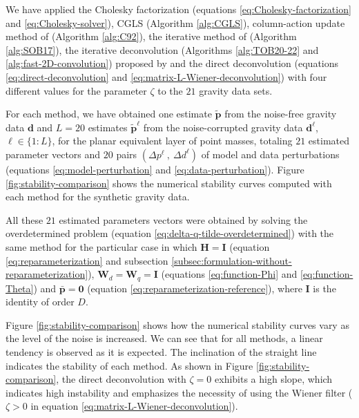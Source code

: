 We have applied the Cholesky factorization (equations \ref{eq:Cholesky-factorization} and \ref{eq:Cholesky-solver}), 
CGLS (Algorithm \ref{alg:CGLS}), column-action update method of \citet{cordell1992} (Algorithm \ref{alg:C92}), 
the iterative method of \citet{siqueira-etal2017} (Algorithm \ref{alg:SOB17}), 
the iterative deconvolution (Algorithms \ref{alg:TOB20-22} and \ref{alg:fast-2D-convolution}) proposed by 
\citet{takahashi-etal2020} and the direct deconvolution 
(equations \ref{eq:direct-deconvolution} and \ref{eq:matrix-L-Wiener-deconvolution})
with four different values for the parameter $\zeta$ to the $21$ gravity data sets.

For each method, we have obtained one estimate $\tilde{\mathbf{p}}$ from the noise-free gravity data $\mathbf{d}$
and $L=20$ estimates $\tilde{\mathbf{p}}^{\ell}$ from the noise-corrupted gravity data $\mathbf{d}^{\ell}$, $\ell \in \{1:L\}$,
for the planar equivalent layer of point masses, totaling $21$ estimated parameter vectors and 
$20$ pairs $\left( \Delta p^{\ell} \: , \: \Delta d^{\ell} \right)$ of model and data perturbations
(equations \ref{eq:model-perturbation} and \ref{eq:data-perturbation}).
Figure \ref{fig:stability-comparison} shows the numerical stability curves computed with each method for 
the synthetic gravity data.

All these $21$ estimated parameters vectors were obtained by solving 
the overdetermined problem (equation \ref{eq:delta-q-tilde-overdetermined}) with the same method for the particular case in which
$\mathbf{H} = \mathbf{I}$ (equation \ref{eq:reparameterization} and 
subsection \ref{subsec:formulation-without-reparameterization}),
$\mathbf{W}_{d} = \mathbf{W}_{q} = \mathbf{I}$ (equations \ref{eq:function-Phi} and \ref{eq:function-Theta}) and
$\bar{\mathbf{p}} = \mathbf{0}$ (equation \ref{eq:reparameterization-reference}), where $\mathbf{I}$ is the identity of order $D$.

Figure \ref{fig:stability-comparison} shows how the numerical stability curves vary as the level of the noise is increased. 
We can see that for all methods, a linear tendency is observed as it is expected. The inclination of the straight line indicates the stability of each method. 
As shown in Figure \ref{fig:stability-comparison}, the direct deconvolution with $\zeta = 0$ exhibits a high slope, which indicates high instability and 
emphasizes the necessity of using the Wiener filter ($\zeta > 0$ in equation \ref{eq:matrix-L-Wiener-deconvolution}). 

